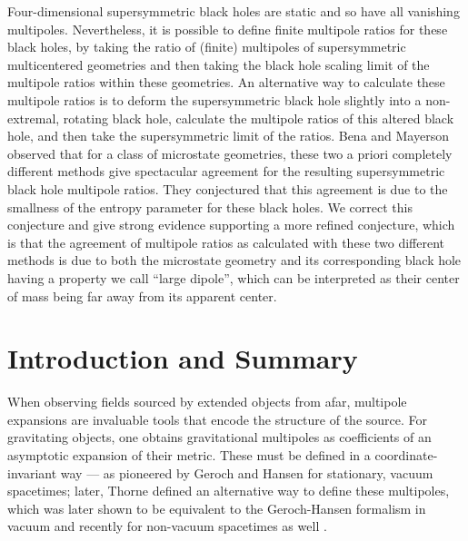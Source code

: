 \documentclass[12pt,a4paper]{article}
\begin{document}
\begin{titlepage}
Four-dimensional supersymmetric black holes are static and so have all vanishing multipoles. Nevertheless, it is possible to define finite multipole ratios for these black holes, by taking the ratio of (finite) multipoles of supersymmetric multicentered geometries and then taking the black hole scaling limit of the multipole ratios within these geometries.
%
An alternative way to calculate these multipole ratios is to deform the supersymmetric black hole slightly into a non-extremal, rotating black hole, calculate the multipole ratios of this altered black hole, and then take the supersymmetric limit of the ratios.
%
Bena and Mayerson observed that for a class of microstate geometries, these two a priori completely different methods give spectacular agreement for the resulting supersymmetric black hole multipole ratios. They conjectured that this agreement is due to the smallness of the entropy parameter for these black holes.
%
We correct this conjecture and give strong evidence supporting a more refined conjecture, which is that the agreement of multipole ratios as calculated with these two different methods is due to both the microstate geometry and its corresponding black hole having a property we call ``large dipole'', which can be interpreted as their center of mass being far away from its apparent center.


\end{titlepage}

\newpage

\setcounter{tocdepth}{2}
\tableofcontents


\newpage
\section{Introduction and Summary}\label{sec:intro}

When observing fields sourced by extended objects from afar, multipole expansions are invaluable tools that encode the structure of the source. For gravitating objects, one obtains gravitational multipoles as coefficients of an asymptotic expansion of their metric. These must be defined in a coordinate-invariant way --- as pioneered by Geroch \cite{Geroch:1970cd} and Hansen \cite{Hansen:1974zz} for stationary, vacuum spacetimes; later, Thorne \cite{Thorne:1980ru} defined an alternative way to define these multipoles, which was later shown to be equivalent to the Geroch-Hansen formalism in vacuum \cite{Gursel:equiv} and recently for non-vacuum spacetimes as well \cite{Mayerson:2022ekj}.
\end{document}
